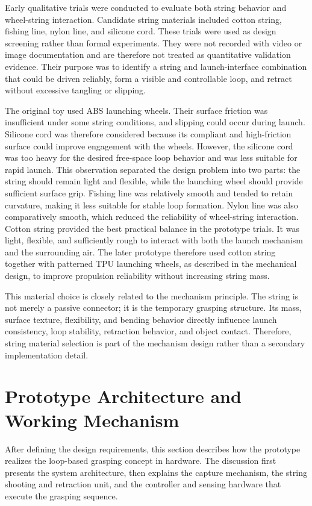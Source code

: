 Early qualitative trials were conducted to evaluate both string behavior and wheel-string interaction. Candidate string materials included cotton string, fishing line, nylon line, and silicone cord. These trials were used as design screening rather than formal experiments. They were not recorded with video or image documentation and are therefore not treated as quantitative validation evidence. Their purpose was to identify a string and launch-interface combination that could be driven reliably, form a visible and controllable loop, and retract without excessive tangling or slipping.

The original toy used ABS launching wheels. Their surface friction was insufficient under some string conditions, and slipping could occur during launch. Silicone cord was therefore considered because its compliant and high-friction surface could improve engagement with the wheels. However, the silicone cord was too heavy for the desired free-space loop behavior and was less suitable for rapid launch. This observation separated the design problem into two parts: the string should remain light and flexible, while the launching wheel should provide sufficient surface grip. Fishing line was relatively smooth and tended to retain curvature, making it less suitable for stable loop formation. Nylon line was also comparatively smooth, which reduced the reliability of wheel-string interaction. Cotton string provided the best practical balance in the prototype trials. It was light, flexible, and sufficiently rough to interact with both the launch mechanism and the surrounding air. The later prototype therefore used cotton string together with patterned TPU launching wheels, as described in the mechanical design, to improve propulsion reliability without increasing string mass.

This material choice is closely related to the mechanism principle. The string is not merely a passive connector; it is the temporary grasping structure. Its mass, surface texture, flexibility, and bending behavior directly influence launch consistency, loop stability, retraction behavior, and object contact. Therefore, string material selection is part of the mechanism design rather than a secondary implementation detail.

\section{Prototype Architecture and Working Mechanism}

After defining the design requirements, this section describes how the prototype realizes the loop-based grasping concept in hardware. The discussion first presents the system architecture, then explains the capture mechanism, the string shooting and retraction unit, and the controller and sensing hardware that execute the grasping sequence.

